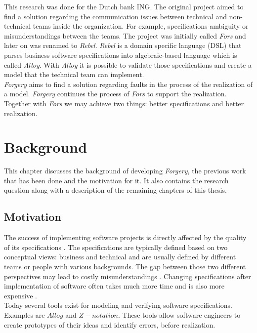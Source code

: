 \documentclass[oneside]{book}
\begin{document}
This research was done for the Dutch bank ING. The original project aimed to find a solution regarding the communication issues between technical and non-technical teams inside the organization. For example, specifications ambiguity or misunderstandings between the teams. The project was initially called \textit{Fors} and later on was renamed to \textit{Rebel}. \textit{Rebel} is a domain specific language (DSL) that parses business software specifications into algebraic-based language which is called \textit{Alloy}. With \textit{Alloy} it is possible to validate those specifications and create a model that the technical team can implement.\\

\textit{Forgery} aims to find a solution regarding faults in the process of the realization of a model. \textit{Forgery} continues the process of \textit{Fors} to support the realization. Together with \textit{Fors} we may achieve two things: better specifications and better realization.\\

\newpage

\chapter{Background}
This chapter discusses the background of developing \textit{Forgery}, the previous work that has been done and the motivation for it. It also contains the research question along with a description of the remaining chapters of this thesis.

\section{Motivation}

The success of implementing software projects is directly affected by the quality of its specifications \cite[p.~12]{requirements}. The specifications are typically defined based on two conceptual views: business and technical and are usually defined by different teams or people with various backgrounds. The gap between those two different perspectives may lead to costly misunderstandings \cite[p.~1]{fors}. Changing specifications after implementation of software often takes much more time and is also more expensive \cite{defectstopten}.\\

Today several tools exist for modeling and verifying software specifications. Examples are $Alloy$ and $Z-notation$. These tools allow software engineers to create prototypes of their ideas and identify errors, before realization. \\
\end{document}
